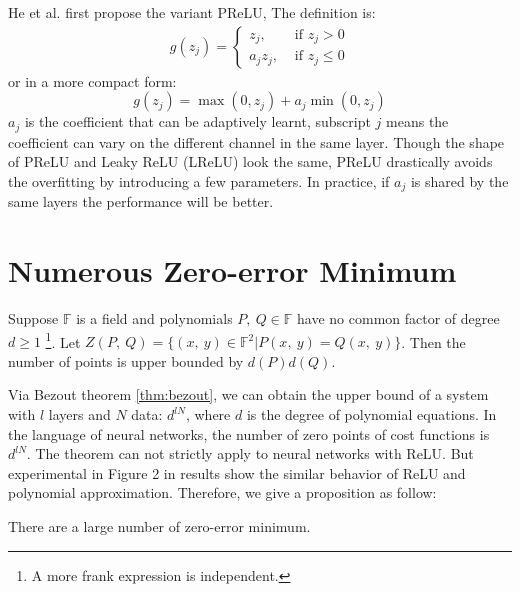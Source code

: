 \begin{appendices}
He et al. \parencite{he2015delving} first propose the variant 
PReLU, The definition is:
\begin{align}
g\left(z_{j}\right)=\left\{\begin{array}{ll}{z_{j},} & {\text { if } z_{j}>0} \\ {a_{j} z_{j},} & {\text { if } z_{j} \leq 0}\end{array}\right.
\end{align}
or in a more compact form:
\begin{equation}
    g(z_j) = \max \left(0, z_{j}\right)+a_{j} \min \left(0, z_{j}\right)
\end{equation}
$ a_j $ is the coefficient that can be adaptively learnt,
subscript $ j $ means the coefficient can vary on the 
different channel in the same layer. Though the shape of 
PReLU and Leaky ReLU (LReLU) look the same, PReLU drastically
avoids the overfitting by introducing a few parameters. 
In practice, if $ a_j $ is shared by the same layers the 
performance will be better.

\section{Numerous Zero-error Minimum}
\begin{thm}
    \label{thm:bezout}
    Suppose $ \mathbb{F} $ is a field and polynomials 
    $ P,\ Q\in \mathbb{F} $ have no common factor of degree $ d\geq 1 $
    \footnote{A more frank expression is independent.}. Let 
    $ Z(P,\ Q) = \{(x,\ y)\in \mathbb{F}^2|P(x,\ y) = Q(x,\ y)\} $.
    Then the number of points is upper bounded by $ d(P)d(Q) $.
\end{thm}
Via Bezout theorem \autoref{thm:bezout}, we can obtain the upper bound of a system 
with $l$ layers and $ N $ data: $ d^{lN} $, where $ d $ is the 
degree of polynomial equations. In the language of neural networks,
the number of zero points of cost functions is $ d^{lN} $. The theorem can
not strictly apply to neural networks with ReLU. But experimental
in Figure 2 in \parencite{poggio2017theory}
results show the similar behavior of ReLU and polynomial approximation.
Therefore, we give a proposition as follow:
\begin{pro}
    There are a large number of zero-error minimum.
\end{pro}

\end{appendices}
